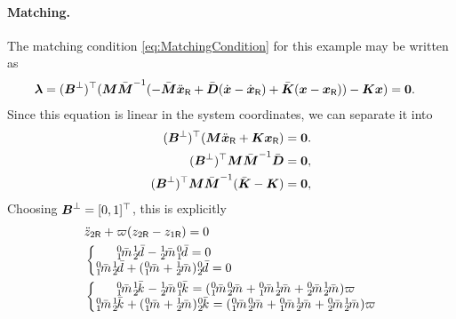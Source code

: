 \paragraph{Matching.}
The matching condition \eqref{eq:MatchingCondition} for this example may be written as
\begin{align}
 \boldsymbol{\lambda} = (\boldsymbol{B}^\bot)^\top (\boldsymbol{M} \bar{\boldsymbol{M}}^{-1} (-\bar{\boldsymbol{M}} \ddot{\boldsymbol{x}}_{\mathsf{R}} + \bar{\boldsymbol{D}} (\dot{\boldsymbol{x}}-\dot{\boldsymbol{x}}_{\mathsf{R}}) + \bar{\boldsymbol{K}} (\boldsymbol{x}-\boldsymbol{x}_{\mathsf{R}})) - \boldsymbol{K} \boldsymbol{x}) &= \boldsymbol{0}.
\end{align}
Since this equation is linear in the system coordinates, we can separate it into
\begin{subequations}
\begin{align}
 (\boldsymbol{B}^\bot)^\top (\boldsymbol{M} \ddot{\boldsymbol{x}}_{\mathsf{R}} + \boldsymbol{K} \boldsymbol{x}_{\mathsf{R}}) &= \boldsymbol{0}.
\\
 (\boldsymbol{B}^\bot)^\top \boldsymbol{M} \bar{\boldsymbol{M}}^{-1} \bar{\boldsymbol{D}} &= \boldsymbol{0},
\\
 (\boldsymbol{B}^\bot)^\top \boldsymbol{M} \bar{\boldsymbol{M}}^{-1} (\bar{\boldsymbol{K}} - \boldsymbol{K}) &= \boldsymbol{0},
\end{align}
\end{subequations}
Choosing $\boldsymbol{B}^\bot = [0, 1]^\top$, this is explicitly
\begin{subequations}
\begin{align}
 &\ddot{z}_{2\idxRef} + \varpi (z_{2\idxRef} - z_{1\idxRef}) = 0
 \label{eq:TwoMassSpringFlatnessCondition}
\\
 &\left\{ \begin{matrix}
  \bodyMassC{0}{1} \bodyDampingC{1}{2} - \bodyMassC{1}{2} \bodyDampingC{0}{1} = 0 \\
  \bodyMassC{0}{1} \bodyDampingC{1}{2} + (\bodyMassC{0}{1} + \bodyMassC{1}{2}) \bodyDampingC{0}{2} = 0
 \end{matrix} \right.
\\
 &\left\{ \begin{matrix}
  \bodyMassC{0}{1} \bodyStiffnessC{1}{2} - \bodyMassC{1}{2} \bodyStiffnessC{0}{1} = (\bodyMassC{0}{1} \bodyMassC{0}{2}+\bodyMassC{0}{1} \bodyMassC{1}{2}+\bodyMassC{0}{2} \bodyMassC{1}{2}) \varpi \\
 \bodyMassC{0}{1} \bodyStiffnessC{1}{2} + (\bodyMassC{0}{1} + \bodyMassC{1}{2}) \bodyStiffnessC{0}{2} = (\bodyMassC{0}{1} \bodyMassC{0}{2}+\bodyMassC{0}{1} \bodyMassC{1}{2}+\bodyMassC{0}{2} \bodyMassC{1}{2}) \varpi
 \end{matrix} \right.
\end{align}
\end{subequations}

